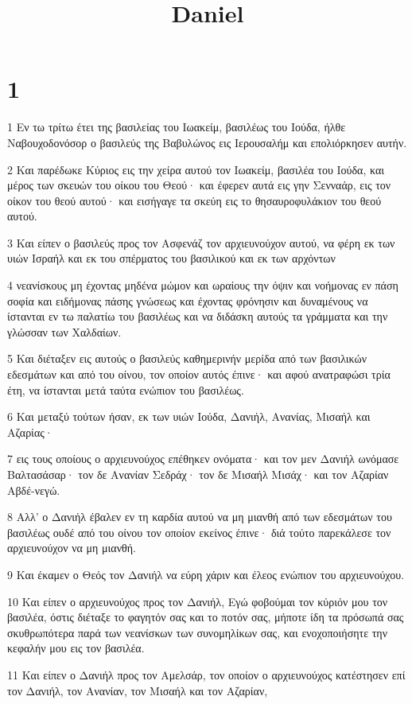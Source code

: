 

\title{Daniel}


\chapter{1}

\par 1 Εν τω τρίτω έτει της βασιλείας του Ιωακείμ, βασιλέως του Ιούδα, ήλθε Ναβουχοδονόσορ ο βασιλεύς της Βαβυλώνος εις Ιερουσαλήμ και επολιόρκησεν αυτήν.
\par 2 Και παρέδωκε Κύριος εις την χείρα αυτού τον Ιωακείμ, βασιλέα του Ιούδα, και μέρος των σκευών του οίκου του Θεού· και έφερεν αυτά εις γην Σενναάρ, εις τον οίκον του θεού αυτού· και εισήγαγε τα σκεύη εις το θησαυροφυλάκιον του θεού αυτού.
\par 3 Και είπεν ο βασιλεύς προς τον Ασφενάζ τον αρχιευνούχον αυτού, να φέρη εκ των υιών Ισραήλ και εκ του σπέρματος του βασιλικού και εκ των αρχόντων
\par 4 νεανίσκους μη έχοντας μηδένα μώμον και ωραίους την όψιν και νοήμονας εν πάση σοφία και ειδήμονας πάσης γνώσεως και έχοντας φρόνησιν και δυναμένους να ίστανται εν τω παλατίω του βασιλέως και να διδάσκη αυτούς τα γράμματα και την γλώσσαν των Χαλδαίων.
\par 5 Και διέταξεν εις αυτούς ο βασιλεύς καθημερινήν μερίδα από των βασιλικών εδεσμάτων και από του οίνου, τον οποίον αυτός έπινε· και αφού ανατραφώσι τρία έτη, να ίστανται μετά ταύτα ενώπιον του βασιλέως.
\par 6 Και μεταξύ τούτων ήσαν, εκ των υιών Ιούδα, Δανιήλ, Ανανίας, Μισαήλ και Αζαρίας·
\par 7 εις τους οποίους ο αρχιευνούχος επέθηκεν ονόματα· και τον μεν Δανιήλ ωνόμασε Βαλτασάσαρ· τον δε Ανανίαν Σεδράχ· τον δε Μισαήλ Μισάχ· και τον Αζαρίαν Αβδέ-νεγώ.
\par 8 Αλλ' ο Δανιήλ έβαλεν εν τη καρδία αυτού να μη μιανθή από των εδεσμάτων του βασιλέως ουδέ από του οίνου τον οποίον εκείνος έπινε· διά τούτο παρεκάλεσε τον αρχιευνούχον να μη μιανθή.
\par 9 Και έκαμεν ο Θεός τον Δανιήλ να εύρη χάριν και έλεος ενώπιον του αρχιευνούχου.
\par 10 Και είπεν ο αρχιευνούχος προς τον Δανιήλ, Εγώ φοβούμαι τον κύριόν μου τον βασιλέα, όστις διέταξε το φαγητόν σας και το ποτόν σας, μήποτε ίδη τα πρόσωπά σας σκυθρωπότερα παρά των νεανίσκων των συνομηλίκων σας, και ενοχοποιήσητε την κεφαλήν μου εις τον βασιλέα.
\par 11 Και είπεν ο Δανιήλ προς τον Αμελσάρ, τον οποίον ο αρχιευνούχος κατέστησεν επί τον Δανιήλ, τον Ανανίαν, τον Μισαήλ και τον Αζαρίαν,
